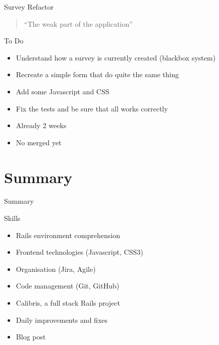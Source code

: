 \documentclass[10pt,a4paper]{beamer}
\begin{document}
\begin{frame}{Survey Refactor}
  \begin{quotation}
    \Large ``The weak part of the application''
  \end{quotation}

  \begin{block}{To Do}
    \begin{itemize}
      \item Understand how a survey is currently created (blackbox system)
      \item Recreate a simple form that do quite the same thing
      \item Add some Javascript and CSS
      \item Fix the tests and be sure that all works correctly
    \end{itemize}
  \end{block}
  
  \begin{block}{}
    \begin{itemize}
      \item Already 2 weeks
      \item No merged yet
    \end{itemize}
  \end{block}
\end{frame}

\section{Summary}

\begin{frame}{Summary}
    \begin{block}{Skills}
    \begin{itemize}
      \item Rails environment comprehension
      \item Frontend technologies (Javascript, CSS3)
      \item Organisation (Jira, Agile)
      \item Code management (Git, GitHub)
    \end{itemize}
  \end{block}
  
  \begin{itemize}
    \item Calibris, a full stack Rails project 
    \item Daily improvements and fixes
    \item Blog post
  \end{itemize}
\end{frame}
\end{document}
